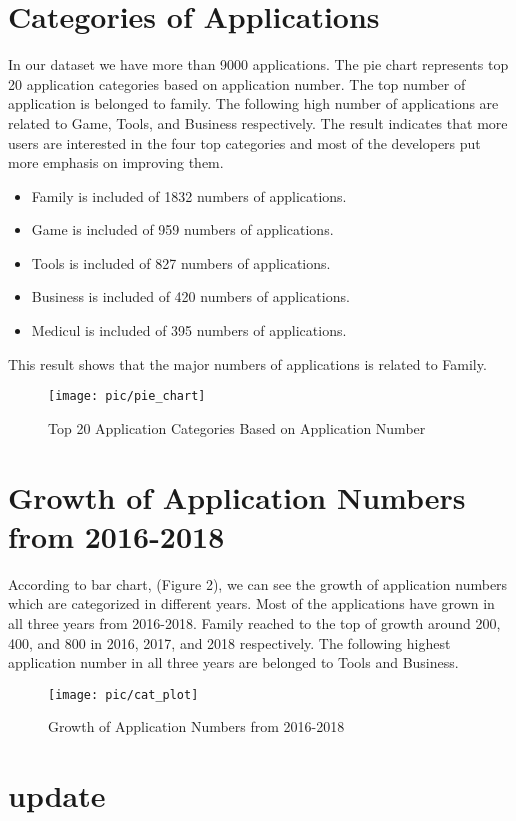 \section*{Categories of Applications}
In our dataset we have more than 9000 applications. The pie chart represents top 20 application categories based on application number. The top number of application is belonged to family. The following high number of applications are related to Game, Tools, and Business respectively. The result indicates that more users are interested in the four top categories and most of the developers put more emphasis on improving them.
\begin{itemize}
\item
  Family is included of 1832  numbers of applications.
\item
  Game is included of 959  numbers of applications.
  \item
  Tools is included of 827  numbers of applications.
\item
  Business is included of 420  numbers of applications.
\item
  Medicul is included of 395  numbers of applications.
\end{itemize}

This result shows that the major numbers of applications is related to Family.
\begin{figure}
\centering
\texttt{[image: pic/pie\_chart]}
\caption{Top 20 Application Categories Based on Application Number}
\label{fig:1}
\end{figure}

\section*{Growth of Application Numbers from 2016-2018}
According to bar chart, (Figure 2), we can see the growth of application numbers which are categorized in different years. Most of the applications have grown in all three years from 2016-2018.
Family reached to the top of growth around 200, 400, and 800 in 2016, 2017, and 2018 respectively. The following highest application number in all three years are belonged to Tools and Business.

\begin{figure}
\centering
\texttt{[image: pic/cat\_plot]}
\caption{Growth of Application Numbers from 2016-2018} 
\label{fig:2}
\end{figure}	

\section*{update}
